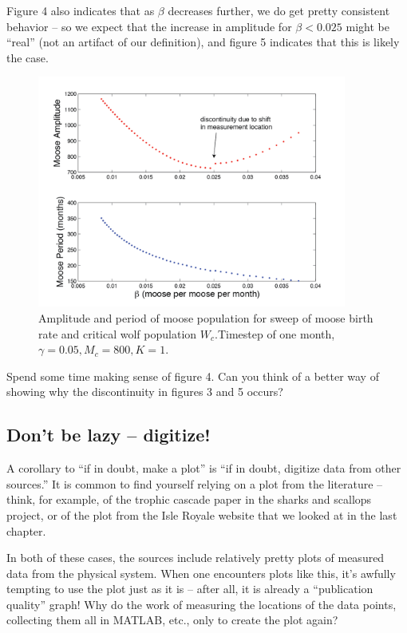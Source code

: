 Figure 4 also indicates that as $\beta$ decreases further, we do get pretty consistent behavior -- so we expect that the increase in amplitude for $\beta < 0.025$ might be ``real'' (not an artifact of our definition), and figure 5 indicates that this is likely the case.
  
\begin{figure}[h!]
\includegraphics[width=4in]{figs/BroaderBCSweep}
\caption{Amplitude and period of moose population for sweep of moose birth rate and critical wolf population $W_c$.Timestep of one month,  $\gamma = 0.05, M_c = 800, K=1$.}
\end{figure}

\begin{del}
Spend some time making sense of figure 4.  Can you think of a better way of showing why the discontinuity in figures 3 and 5 occurs?
\end{del}
\subsection{Don't be lazy -- digitize!}

A corollary to ``if in doubt, make  a plot''  is ``if in doubt, digitize data from other sources.''   It is common to find yourself relying on a plot from the literature -- think, for example, of the trophic cascade paper in the sharks and scallops project, or of the plot from the Isle Royale website that we looked at in the last chapter.  

In both of these cases, the sources include relatively pretty plots of measured data from the physical system.  When one encounters plots like this, it's awfully tempting to use the plot just as it is -- after all, it is already a ``publication quality'' graph!  Why do the work of measuring the locations of the data points, collecting them all in MATLAB, etc., only to create the plot again?

